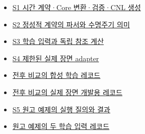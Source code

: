 \documentclass[11pt,a4paper]{article}
\begin{document}
\begin{itemize}\setlength{\itemsep}{0pt}\setlength{\parsep}{0pt}\setlength{\topsep}{2pt}
\item \href{\detokenize{../../../../../../projects/04-guardsynth-coc/experiments/paper1_cnl_learning/temporal_preservation.py}}{S1 시간 계약·Core 변환·검증·CNL 생성}
\item \href{\detokenize{../../../../../../platforms/eblc-bcv/src/guard_synth_eblc/action_contract.py}}{S2 정성적 계약의 파서와 수명주기 의미}
\item \href{\detokenize{../../../../../../projects/04-guardsynth-coc/experiments/paper1_cnl_learning/temporal_training_data.py}}{S3 학습 입력과 독립 참조 계산}
\item \href{\detokenize{../../../../../../projects/04-guardsynth-coc/src/guard_synth/qualitative_scene_contract.py}}{S4 제한된 실제 장면 adapter}
\item \href{\detokenize{../temporal-training-data-2026-09-29-001/train_paired.jsonl}}{전후 비교의 합성 학습 레코드}
\item \href{\detokenize{../../../restricted/guardsynth-eblc-learning-001/speed-development-packaging-2026-09-29-003/l3_admitted_train.jsonl}}{전후 비교의 실제 장면 개발용 레코드}
\item \href{\detokenize{../methodology-2026-09-30-001/manuscript_examples.json}}{S5 원고 예제의 실행 질의와 결과}
\item \href{\detokenize{../methodology-2026-09-30-001/learning_input_examples.json}}{원고 예제의 두 학습 입력 레코드}
\end{itemize}
\endgroup
\end{document}
